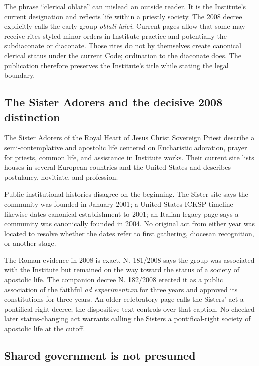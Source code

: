 The phrase ``clerical oblate'' can mislead an outside reader. It is the Institute's current designation and reflects life within a priestly society. The 2008 decree explicitly calls the early group \emph{oblati laici}. Current pages allow that some may receive rites styled minor orders in Institute practice and potentially the subdiaconate or diaconate. Those rites do not by themselves create canonical clerical status under the current Code; ordination to the diaconate does. The publication therefore preserves the Institute's title while stating the legal boundary.

\subsection{The Sister Adorers and the decisive 2008 distinction}

The Sister Adorers of the Royal Heart of Jesus Christ Sovereign Priest describe a semi-contemplative and apostolic life centered on Eucharistic adoration, prayer for priests, common life, and assistance in Institute works. Their current site lists houses in several European countries and the United States and describes postulancy, novitiate, and profession.

Public institutional histories disagree on the beginning. The Sister site says the community was founded in January 2001; a United States ICKSP timeline likewise dates canonical establishment to 2001; an Italian legacy page says a community was canonically founded in 2004. No original act from either year was located to resolve whether the dates refer to first gathering, diocesan recognition, or another stage.

The Roman evidence in 2008 is exact. N. 181/2008 says the group was associated with the Institute but remained on the way toward the status of a society of apostolic life. The companion decree N. 182/2008 erected it as a public association of the faithful \emph{ad experimentum} for three years and approved its constitutions for three years. An older celebratory page calls the Sisters' act a pontifical-right decree; the dispositive text controls over that caption. No checked later status-changing act warrants calling the Sisters a pontifical-right society of apostolic life at the cutoff.

\subsection{Shared government is not presumed}

